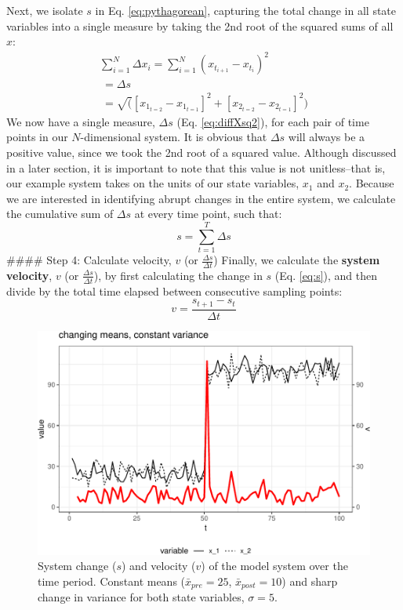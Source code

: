 \documentclass[12pt,twoside,openany]{reedthesis}
\begin{document}
Next, we isolate \(s\) in Eq. \eqref{eq:pythagorean}, capturing the total change in all state variables into a single measure by taking the 2nd root of the squared sums of all \(x\):
\begin{equation}
\begin{array}{rcr}
\sum_{i=1}^{N} \Delta {x_i} = \sum_{i=1}^{N}(x_{t_{i+1}} - x_{t_i})^2 \\ 
\ = \Delta s \\ 
\ = \sqrt([x_{1_{t=2}} - x_{1_{t=1}}]^2 + [x_{2_{t=2}} - x_{2_{t=1}}]^2)
\end{array}
\label{eq:diffXsq2}
\end{equation}
We now have a single measure, \(\Delta s\) (Eq. \eqref{eq:diffXsq2}), for each pair of time points in our \(N\)-dimensional system. It is obvious that \(\Delta s\) will always be a positive value, since we took the 2nd root of a squared value. Although discussed in a later section, it is important to note that this value is not unitless--that is, our example system takes on the units of our state variables, \(x_1\) and \(x_2\). Because we are interested in identifying abrupt changes in the entire system, we calculate the cumulative sum of \(\Delta s\) at every time point, such that:
\begin{equation}
s = \sum_{t=1}^T \Delta s
\label{eq:s}
\end{equation}
\#\#\#\# Step 4: Calculate velocity, \(v\) (or \(\frac {\Delta s}{\Delta t}\))
Finally, we calculate the \textbf{system velocity}, \(v\) (or \(\frac{\Delta s}{\Delta t}\)), by first calculating the change in \(s\) (Eq. \eqref{eq:s}), and then divide by the total time elapsed between consecutive sampling points:
\begin{equation}
 v = \frac {s_{t+1}-s_{t}}{\Delta t} 
\label{eq:velocity}
\end{equation}
\begin{figure}

{\centering \includegraphics[width=0.95\linewidth]{_myDissertation_files/figure-latex/velocSysEx1-1} 

}

\caption{System change ($s$) and velocity ($v$) of the model system over the time period. Constant means ($\bar{x}_{pre}=25$, $\bar{x}_{post}=10$) and sharp change in variance for both state variables, $\sigma =5$.}\label{fig:velocSysEx1}
\end{figure}
\end{document}
